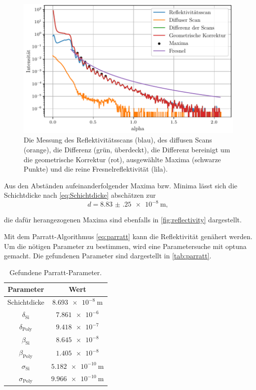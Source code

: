 \begin{figure}[H]
    \centering
    \includegraphics[width=\textwidth]{plots/reflectivity.pdf}
    \caption{Die Messung des Reflektivitätsscans (blau), des diffusen Scans (orange), die Differenz (grün, überdeckt), die Differenz bereinigt um die geometrische Korrektur (rot), ausgewählte Maxima (schwarze Punkte) und die reine Fresnelreflektivität (lila).}
    \label{fig:reflectivity}
\end{figure}

Aus den Abständen aufeinanderfolgender Maxima bzw. Minima lässt sich die Schichtdicke nach \autoref{eq:Schichtdicke} abschätzen zur
\begin{equation*}
    d = \qty{8.83(25)e-8}{\meter},
\end{equation*}

die dafür herangezogenen Maxima sind ebenfalls in \autoref{fig:reflectivity} dargestellt.

Mit dem Parratt-Algorithmus \ref{eq:parratt} kann die Reflektivität genähert werden. Um die nötigen Parameter zu bestimmen,
wird eine Parametersuche mit optuna gemacht. Die gefundenen Parameter sind dargestellt in \autoref{tab:parratt}.

\begin{table}[H]
    \centering
    \caption{Gefundene Parratt-Parameter.}
    \label{tab:parratt}
    \begin{tabular}{c c}
        \toprule
        {Parameter} & {Wert} \\
        \midrule
        Schichtdicke & $\qty{8.693e-8}{\meter}$ \\
        $\delta_\text{Si}$ & $\num{7.861e-6}$ \\
        $\delta_\text{Poly}$ & $\num{9.418e-7}$ \\
        $\beta_\text{Si}$    & $\num{8.645e-8}$ \\
        $\beta_\text{Poly}$  & $\num{1.405e-8}$ \\
        $\sigma_\text{Si}$   & $\qty{5.182e-10}{\meter}$ \\
        $\sigma_\text{Poly}$ & $\qty{9.966e-10}{\meter}$ \\
        \bottomrule
    \end{tabular}
\end{table}

